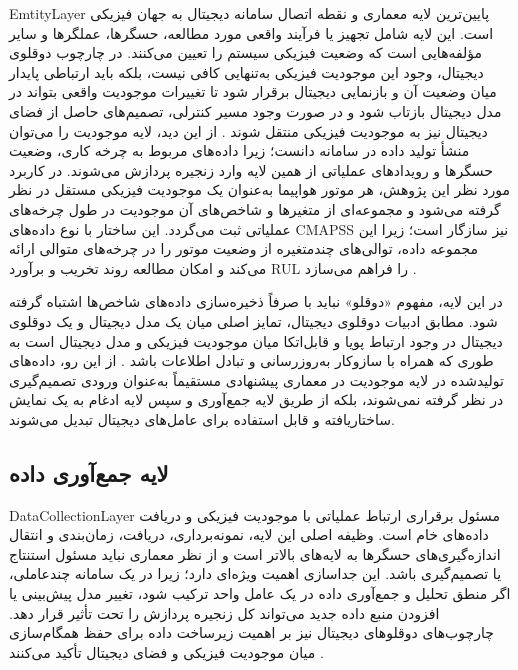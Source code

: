 \gls{EmtityLayer} پایین‌ترین لایه معماری و نقطه اتصال سامانه دیجیتال به جهان فیزیکی است. این لایه شامل تجهیز یا فرآیند واقعی مورد مطالعه، حسگرها، عملگرها و سایر مؤلفه‌هایی است که وضعیت فیزیکی سیستم را تعیین می‌کنند. در چارچوب دوقلوی دیجیتال، وجود این موجودیت فیزیکی به‌تنهایی کافی نیست، بلکه باید ارتباطی پایدار میان وضعیت آن و بازنمایی دیجیتال برقرار شود تا تغییرات موجودیت واقعی بتواند در مدل دیجیتال بازتاب شود و در صورت وجود مسیر کنترلی، تصمیم‌های حاصل از فضای دیجیتال نیز به موجودیت فیزیکی منتقل شوند \cite{tao2019digital,barricelli2019survey,fuller2020digital}.
 از این دید، لایه موجودیت را می‌توان منشأ تولید داده در سامانه دانست؛ زیرا داده‌های مربوط به چرخه کاری، وضعیت حسگرها و رویدادهای عملیاتی از همین لایه وارد زنجیره پردازش می‌شوند. در کاربرد مورد نظر این پژوهش، هر موتور هواپیما به‌عنوان یک موجودیت فیزیکی مستقل در نظر گرفته می‌شود و مجموعه‌ای از متغیرها و شاخص‌های آن موجودیت در طول چرخه‌های عملیاتی ثبت می‌گردد. این ساختار با نوع داده‌های \gls{CMAPSS} نیز سازگار است؛ زیرا این مجموعه داده، توالی‌های چندمتغیره از وضعیت موتور را در چرخه‌های متوالی ارائه می‌کند و امکان مطالعه روند تخریب و برآورد \gls{RUL} را فراهم می‌سازد \cite{NASA2007C-MAPSS}.

در این لایه، مفهوم «دوقلو» نباید با صرفاً ذخیره‌سازی داده‌های شاخص‌ها اشتباه گرفته شود. مطابق ادبیات دوقلوی دیجیتال، تمایز اصلی میان یک مدل دیجیتال و یک دوقلوی دیجیتال در وجود ارتباط پویا و قابل‌اتکا میان موجودیت فیزیکی و مدل دیجیتال است به طوری که همراه با سازوکار به‌روزرسانی و تبادل اطلاعات باشد \cite{fuller2020digital,tao2019digital}. از این رو، داده‌های تولیدشده در لایه موجودیت در معماری پیشنهادی مستقیماً به‌عنوان ورودی تصمیم‌گیری در نظر گرفته نمی‌شوند، بلکه از طریق لایه جمع‌آوری و سپس لایه ادغام به یک نمایش ساختاریافته و قابل استفاده برای عامل‌های دیجیتال تبدیل می‌شوند.


\subsection{لایه جمع‌آوری داده}
\label{sec:layer-collection}

\gls{DataCollectionLayer} مسئول برقراری ارتباط عملیاتی با موجودیت فیزیکی و دریافت داده‌های خام است. وظیفه اصلی این لایه، نمونه‌برداری، دریافت، زمان‌بندی و انتقال اندازه‌گیری‌های حسگرها به لایه‌های بالاتر است و از نظر معماری نباید مسئول استنتاج یا تصمیم‌گیری باشد. این جداسازی اهمیت ویژه‌ای دارد؛ زیرا در یک سامانه چندعاملی، اگر منطق تحلیل و جمع‌آوری داده در یک عامل واحد ترکیب شود، تغییر مدل پیش‌بینی یا افزودن منبع داده جدید می‌تواند کل زنجیره پردازش را تحت تأثیر قرار دهد. چارچوب‌های  دوقلو‌های دیجیتال نیز بر اهمیت زیرساخت داده برای حفظ همگام‌سازی میان موجودیت فیزیکی و فضای دیجیتال تأکید می‌کنند \cite{qi2021enabling,fuller2020digital}.

